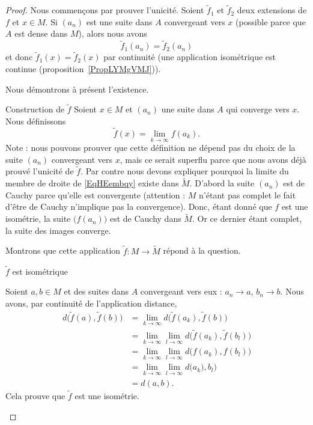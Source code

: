 \begin{proof}
    Nous commençons par prouver l'unicité. Soient \( \tilde f_1\) et \( \tilde f_2\) deux extensions de \( f\) et \( x\in M\). Si \( (a_n)\) est une suite dans \( A\) convergeant vers \( x\) (possible parce que \( A\) est dense dans \( M\)), alors nous avons
    \begin{equation}
        \tilde f_1(a_n)=\tilde f_2(a_n)
    \end{equation}
    et donc \( \tilde f_1(x)=\tilde f_2(x)\) par continuité (une application isométrique est continue (proposition~\ref{PropLYMgVMJ})).

    Nous démontrons à présent l'existence.

    \begin{subproof}
    \item[Construction de \( \tilde f\)]
    Soient \( x\in M\) et \( (a_n)\) une suite dans \( A\) qui converge vers \( x\). Nous définissons
    \begin{equation}    \label{EqHEembqy}
        \tilde f(x)=\lim_{k\to \infty} f(a_k).
    \end{equation}
    Note : nous pouvons prouver que cette définition ne dépend pas du choix de la suite \( (a_n)\) convergeant vers \( x\), mais ce serait superflu parce que nous avons déjà prouvé l'unicité de \( \tilde f\). Par contre nous devons expliquer pourquoi la limite du membre de droite de \eqref{EqHEembqy} existe dans \( \tilde M\). D'abord la suite \( (a_n)\) est de Cauchy parce qu'elle est convergente (attention : \( M\) n'étant pas complet le fait d'être de Cauchy n'implique pas la convergence). Donc, étant donné que \( f\) est une isométrie, la suite \( \big( f(a_n) \big)\) est de Cauchy dans \( \tilde M\). Or ce dernier étant complet, la suite des images converge.

    Montrons que cette application \( \tilde f\colon M\to \tilde M\) répond à la question.

\item[\( \tilde f\) est isométrique]

        Soient \( a,b\in M\) et des suites dans \( A\) convergeant vers eux : \( a_n\to a\), \( b_n\to b\). Nous avons, par continuité de l'application distance,
        \begin{subequations}
            \begin{align}
                d\big( \tilde f(a),\tilde f(b) \big)&=\lim_{k\to \infty} d\big( \tilde f(a_k),\tilde f(b) \big)\\
                &=\lim_{k\to \infty}\lim_{l\to \infty}  d\big( \tilde f(a_k),\tilde f(b_l) \big)\\
                &=\lim_{k\to \infty}\lim_{l\to \infty}  d\big(  f(a_k), f(b_l) \big)\\
                &=\lim_{k\to \infty}\lim_{l\to \infty}  d\big( a_k),b_l\big)\\
                &=d(a,b).
            \end{align}
        \end{subequations}
        Cela prouve que \( \tilde f\) est une isométrie.


\end{subproof}
\end{proof}
